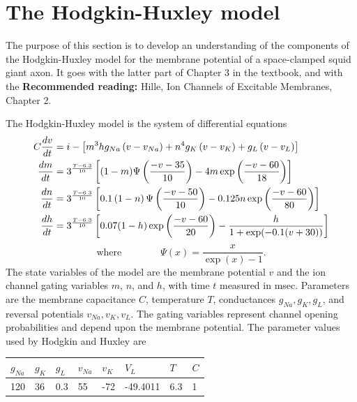 \documentclass [11pt]{article}
\numberwithin{exercise}{section}
\begin{document}
\section{The Hodgkin-Huxley model}
The purpose of this section is to develop an understanding of the 
components of the Hodgkin-Huxley model for the membrane potential of
a space-clamped squid giant axon. It goes with the latter part
of Chapter 3 in the textbook, and with the \textbf{Recommended reading:} 
Hille, Ion Channels of Excitable Membranes, Chapter 2.

The Hodgkin-Huxley model is the system of differential equations
\begin{equation}
\begin{aligned} 
C \frac{dv}{dt} & =i - \left[m^{3}h g_{Na}\left(v-v_{Na}\right) 
+n^{4}g_{K}\left(v-v_{K}\right) +g_{L} \left(v-v_{L}\right) \right]  \\
\frac{dm}{dt}& =3^\frac{T-6.3}{10} \left[ (1-m) \Psi\left(\frac{-v-35}{10}\right) 
-4m \exp \left(\frac{-v-60}{18}\right) \right] \\
\frac{dn}{dt}&=3^\frac{T-6.3}{10} \left[ 0.1 \left( {1-n} \right) \Psi \left(\frac{-v-50}{10} \right) 
-0.125 n \exp \left(\frac{-v-60}{80} \right) \right]  \\
\frac{dh}{dt}&=3^\frac{T-6.3}{10} \left[0.07 {\left( {1-h}\right) 
\exp \nolimits \left( {{{-v-60} \over {20}}}\right) -{{h} \over {1+ \exp \nolimits ({-0.1(v+30)})}}} \right] 
\end{aligned}
\label{HHfull} 
\end{equation}
$$ \mbox{where} \qquad \qquad \Psi(x) = \frac{x}{\exp(x) - 1}. $$
The state variables of the model are the membrane potential $v$ and the ion channel
gating variables $m$, $n$, and $h$, with time $t$ measured in msec. Parameters are 
the membrane capacitance $C$, temperature $T$, conductances $g_{Na},g_K,g_L$, 
and reversal potentials $v_{Na},v_K,v_L$. The gating variables represent channel 
opening probabilities and depend upon the membrane potential.
The parameter values used by Hodgkin and Huxley are 
\begin{table}[h!]
\label{HHparams}
\begin{center}
\begin{tabular}
{|p{30pt}|p{30pt}|p{30pt}|p{30pt}|p{30pt}|p{50pt}|p{30pt}|p{30pt}|}
\hline
$g_{Na}$& 
$g_K$& 
$g_L$& 
$v_{Na}$& 
$v_K$& 
$V_L$& 
$T$& 
$C$ \\
\hline
120& 
36& 
0.3& 
55& 
-72& 
-49.4011& 
6.3& 
1 \\
\hline
\end{tabular}
\end{center}
\end{table}
\end{document}
